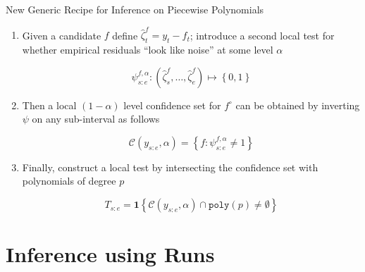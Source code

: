 \documentclass{beamer}
\begin{document}

\begin{frame}{New Generic Recipe for Inference on Piecewise Polynomials}

\begin{enumerate}[<+->]
\item Given a candidate $f$ define $\hat{\zeta}_t^f = y_t - f_t$; introduce a second local test for whether empirical residuals ``look like noise'' at some level $\alpha$

\begin{equation*}
	\psi_{s:e}^{f,\alpha} : \left ( \hat{\zeta}_s^f, \dots, \hat{\zeta}_e^f \right ) \mapsto \left \{ 0, 1 \right \}
\end{equation*}

\item Then a local $(1-\alpha)$ level confidence set for $f^\circ$ can be obtained by inverting $\psi$ on any sub-interval as follows

\begin{equation*}
	\mathcal{C} \left ( y_{s:e}, \alpha \right ) = \left \{ f: \psi^{f,\alpha}_{s:e} \neq 1 \right \}
\end{equation*}

\item Finally, construct a local test by intersecting the confidence set with polynomials of degree $p$

\begin{equation*}
	T_{s:e} = \mathbf{1} \left \{ \mathcal{C} \left ( y_{s:e}, \alpha \right ) \cap \texttt{poly} (p) \neq \emptyset \right \}
\end{equation*}
\end{enumerate}
\end{frame}

\section{Inference using Runs}

\begin{frame}
\tableofcontents[currentsection]
\end{frame}
\end{document}
